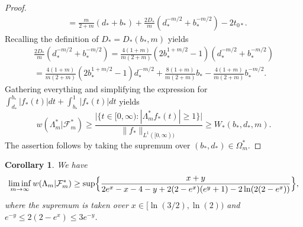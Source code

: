 \documentclass[a4paper]{amsart} %
\newtheorem{corollary}[theorem]{Corollary} %
\theoremstyle{definition}
\theoremstyle{remark}
\numberwithin{equation}{section}
\newcommand*{\weakconstrestricted}[2]{w(#1|#2)} %
\newcommand*{\fclassspecStar}[1]{\mathcal{F}_{#1}^*}
\newcommand*{\fStar}{f_{*}}
\newcommand*{\bStar}{b_*}
\newcommand*{\dStar}{d_*}
\newcommand*{\dOneStar}{D_*}%
\newcommand*{\tZeroStar}{t_{0*}}
\newcommand*{\specialbdStar}[1]{\Omega_{#1}^*}
\newcommand*{\XXXspecialbdStar}{W_*}
\begin{document}
\begin{proof}
\begin{align*}
	&=  \frac{m}{2+m}(\dStar+ \bStar) + \frac{2\dOneStar}{m} (\dStar^{-m/2} + \bStar^{-m/2})
	- 2\tZeroStar.
	\end{align*}
	Recalling the definition of $\dOneStar = \dOneStar(\bStar, m)$ yields
	\begin{multline*}
	\frac{2\dOneStar}{m} (\dStar^{-m/2} + \bStar^{-m/2}) 
	= \frac{4(1+m)}{m(2+m)}(2\bStar^{1+m/2}  -1)(\dStar^{-m/2} + \bStar^{-m/2})\\
	=\frac{4(1+m)}{m(2+m)}(2\bStar^{1+m/2}  -1)\dStar^{-m/2} 
	+\frac{8(1+m)}{m(2+m)} \bStar  - \frac{4(1+m)}{m(2+m)} \bStar^{-m/2}.
	\end{multline*}
	Gathering everything and simplifying the expression for $\int_{\dStar}^{\bStar} |\fStar(t)| dt+ \int_{\bStar}^1 |\fStar(t)| dt$ yields
	\[
		\weakconstrestricted{\Lambda_m^*}{\fclassspecStar{m}} 
		\geq
		\frac{	\bigl|\{t\in[0,\infty) : |\Lambda_m^* \fStar(t)|\geq 1\} \bigr|}{\|\fStar\|_{L^1([0, \infty))} } 
		\geq		\XXXspecialbdStar(\bStar,\dStar,m).
	\]
	The assertion follows by taking the supremum over $(\bStar,\dStar)\in \specialbdStar{m} $.
\end{proof}

\begin{corollary}
	\label{cor:lower-bound-asymptotic-special-b-c-d-alternate-expression-star}
	We have 
	\begin{equation*}
	\liminf_{m\to \infty} \weakconstrestricted{\Lambda_m}{\fclassspecStar{m}}
	\geq
	\sup\Bigl\{ 
	\frac{x + y}{2e^x - x -4  - y + 2(2-e^x) (e^y + 1) -2\ln(2(2-e^x))}
	\Bigr\},
	\end{equation*}
	where the supremum is taken over
	$x\in [\ln(3/2), \ln(2))$
	and $e^{-y} \leq 2(2-e^x) \leq  3e^{-y}$.
\end{corollary}
\end{document}
